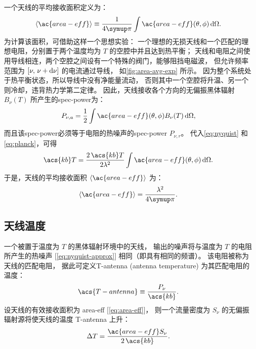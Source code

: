 一个天线的平均接收面积定义为：
\begin{equation}
  \label{eq:area-avg1}
  \langle \ac{area-eff} \rangle
    \equiv \frac{1}{4\Cpi} \int \ac{area-eff}(\theta,\phi) \,\D{\Omega} .
\end{equation}
为计算该面积，可借助这样一个思想实验：
一个理想的无损天线和一个匹配的理想电阻，分别置于两个温度均为 $T$ 的空腔中并且达到热平衡；
天线和电阻之间使用导线相连，两个空腔之间设有一个特殊的阀门，能够阻挡电磁波，
但允许频率范围为 $[\nu, \,\nu+\mathrm{d}\nu]$ 的电流通过导线，
如\autoref{fig:area-avg-exp} 所示。
因为整个系统处于热平衡状态，所以导线中没有净能量流动，
否则其中一个空腔将升温、另一个则冷却，违背热力学第二定律。
因此，天线接收各个方向的无偏振黑体辐射 $B_{\nu}(T)$ 所产生的\ac{spec-power}为：
\begin{equation}
  P_{\nu,a} =
    \frac{1}{2} \int \ac{area-eff}(\theta,\phi) B_{\nu}(T) \,\D{\Omega} ,
\end{equation}
而且该\ac{spec-power}必须等于电阻的热噪声的\ac{spec-power} $P_{\nu,r}$。
代入\autoref{eq:nyquist} 和\autoref{eq:planck}，可得
\begin{equation}
  \acs{kb}T =
    \frac{2\,\acs{kb}T}{2\lambda^2}
      \int \ac{area-eff}(\theta,\phi) \,\D{\Omega} .
\end{equation}
于是，天线的平均接收面积 $\langle \ac{area-eff} \rangle$ 为：
\begin{equation}
  \label{eq:area-avg}
  \langle \ac{area-eff} \rangle = \frac{\lambda^2}{4\Cpi} .
\end{equation}

\subsection{天线温度}

一个被置于温度为 $T$ 的黑体辐射环境中的天线，
输出的噪声将与温度为 $T$ 的电阻所产生的热噪声 [\autoref{eq:nyquist-approx}]
相同（即具有相同的频谱）。
该电阻被称为天线的匹配电阻，
据此可定义\acl{T-antenna} (antenna temperature) 为其匹配电阻的温度：
\begin{equation}
  \label{eq:t-ant}
  \acs{T-antenna} \equiv \frac{P_{\nu}}{\acs{kb}} .
\end{equation}
设天线的有效接收面积为 \ac{area-eff} [\autoref{eq:area-eff}]，
则一个流量密度为 $S_{\nu}$ 的无偏振辐射源将使天线的温度 \acs{T-antenna} 上升：
\begin{equation}
  \label{eq:dt-source}
  \Delta T = \frac{\ac{area-eff} S_{\nu}}{2\,\acs{kb}} .
\end{equation}


